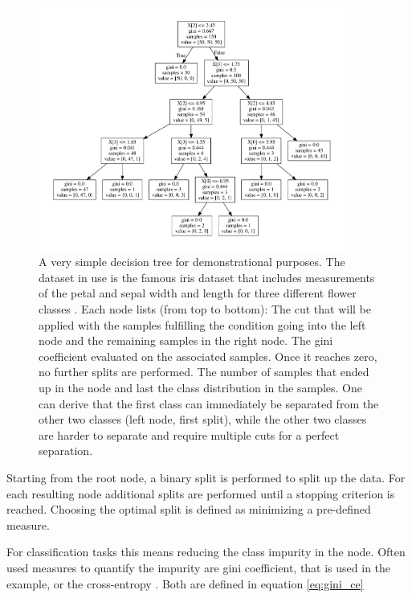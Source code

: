\begin{figure}
  \centering
  \captionsetup{width=0.9\linewidth}
  \includegraphics[width=0.9\textwidth]{Plots/decision_tree.pdf}
  \caption{A very simple decision tree for demonstrational purposes.
      The dataset in use is the famous iris dataset that includes
      measurements of the petal and sepal width and length
      for three different flower classes \cite{fisher1936use}.
      Each node lists (from top to bottom): The cut that will
      be applied with the samples fulfilling the condition going
      into the left node and the remaining samples in the right node.
      The gini coefficient evaluated on the associated samples.
      Once it reaches zero, no further splits are performed.
      The number of samples that ended up in the node and last the
      class distribution in the samples.
      One can derive that the first class can immediately be separated from
      the other two classes (left node, first split), while the other two classes
      are harder to separate and require multiple cuts for a perfect separation.}
  \label{fig:03_tree}
\end{figure}

Starting from the root node, a binary split is performed to
split up the data. For each resulting node additional splits are performed
until a stopping criterion is reached.
Choosing the optimal split is defined as minimizing a
pre-defined measure.

For classification tasks this means reducing the class impurity in the node.
Often used measures
to quantify the impurity are gini coefficient, that is used in the example, or the
cross-entropy \cite{hastie2017springer}.
Both are defined in equation \ref{eq:gini_ce}


